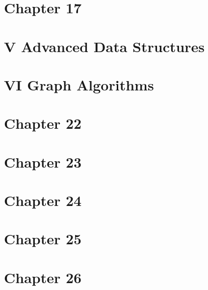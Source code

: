 \documentclass[12pt,a4paper]{article}
\begin{document}
\section*{Chapter 17}







\pagebreak


\section*{V Advanced Data Structures}
\pagebreak




\section*{VI Graph Algorithms}
\pagebreak


\section*{Chapter 22}






\pagebreak


\section*{Chapter 23}






\pagebreak


\section*{Chapter 24}

\pagebreak



\section*{Chapter 25}




\pagebreak


\section*{Chapter 26}







\pagebreak
\end{document}
